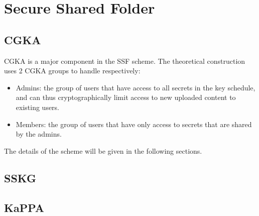 \chapter{Secure Shared Folder}\label{ch:ssf}



\section{CGKA}

CGKA is a major component in the SSF scheme.
The theoretical construction uses 2 CGKA groups to handle respectively:

\begin{itemize}
    \item Admins: the group of users that have access to all secrets in the key schedule, and can thus cryptographically limit access to new uploaded content to existing users.
    \item Members: the group of users that have only access to secrets that are shared by the admins.
\end{itemize}

The details of the scheme will be given in the following sections.

\section{SSKG}

\section{KaPPA}

